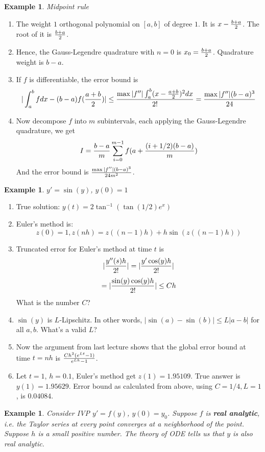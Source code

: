 \documentclass[20pt]{article} %
\theoremstyle{break}
\newtheorem{exa}[definition]{Example}
\begin{document}
\newpage

\begin{exa}Midpoint rule\end{exa}
\begin{enumerate}
\item The weight $1$ orthogonal polynomial on $[a, b]$ of degree $1$. It is $x-{b+a\over 2}$. The root of it is ${b+a\over 2}$.
\item Hence, the Gauss-Legendre quadrature with $n=0$ is $x_0={b+a\over 2}$. Quadrature weight is ${b-a}$.
\item If $f$ is differentiable, the error bound is
  \[|\int_a^bfdx-{(b-a)}f({a+b\over 2})|\leq {\max|f''|\int_a^b(x-{a+b\over 2})^2dx\over 2!}={\max|f''|(b-a)^3\over 24}\]
\item Now decompose $f$ into $m$ subintervals, each applying the Gauss-Legendre quadrature, we get
  \[I={b-a\over m}\sum_{i=0}^{m-1} f(a+{(i+1/2)(b-a)\over m})\]
  And the error bound is $\max|f''|(b-a)^3\over 24m^2$.
\end{enumerate}

\newpage

\begin{exa} $y'=\sin(y)$, $y(0)=1$\end{exa}
\begin{enumerate}
\item True solution: $y(t)=2\tan^{-1}(\tan(1/2)e^x)$\\
\item Euler's method is:
\[z(0)=1, z(nh)=z((n-1)h)+h\sin(z((n-1)h))\]
\item Truncated error for Euler's method at time $t$ is
  \[|{y''(s)h\over 2!}|=|{y'\cos(y)h\over 2!}|\]
  \[=|{\sin(y)\cos(y)h\over 2!}|\leq Ch\]
  What is the number $C$?
\item $\sin(y)$ is $L$-Lipschitz. In other words, $|\sin(a)-\sin(b)|\leq L|a-b|$ for all $a, b$. What's a valid $L$?
\item Now the argument from last lecture shows that the global error bound at time $t=nh$ is ${Ch^2(e^{Lt}-1)\over e^{Lh}-1}$. 
\item Let $t=1$, $h=0.1$, Euler's method get $z(1)=1.95109$. True answer is $y(1)=1.95629$. Error bound as calculated from above, using $C=1/4, L=1$, is $0.04084$.
\end{enumerate}


\newpage

\begin{exa}Consider IVP $y'=f(y)$, $y(0)=y_0$. Suppose $f$ is {\bf real analytic}, i.e. the Taylor series at every point converges at a neighborhood of the point. Suppose $h$ is a small positive number. The theory of ODE tells us that $y$ is also real analytic.\end{exa}
\end{document}

